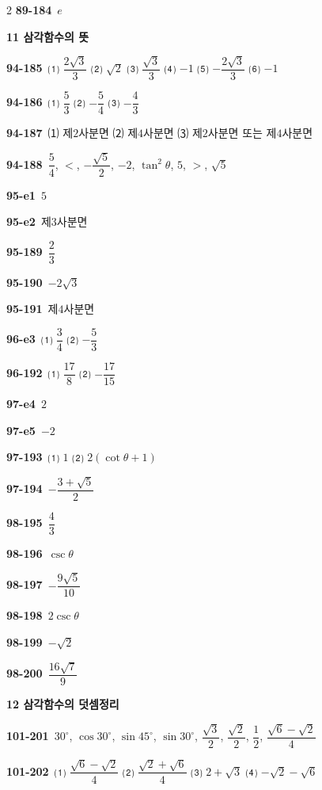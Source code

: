 \documentclass[10pt,a4paper]{article}
\begin{document}
\begin{multicols}{2}
\noindent\textbf{89-184}\ $e$\par
\noindent\textbf{11 삼각함수의 뜻}\par\smallskip
\noindent\textbf{94-185}\ ⑴ $\dfrac{2\sqrt{3}}{3}$ ⑵ $\sqrt{2}$ ⑶ $\dfrac{\sqrt{3}}{3}$ ⑷ $-1$ ⑸ $-\dfrac{2\sqrt{3}}{3}$ ⑹ $-1$\par
\noindent\textbf{94-186}\ ⑴ $\dfrac{5}{3}$ ⑵ $-\dfrac{5}{4}$ ⑶ $-\dfrac{4}{3}$\par
\noindent\textbf{94-187}\ ⑴ 제$2$사분면 ⑵ 제$4$사분면 ⑶ 제$2$사분면 또는 제$4$사분면\par
\noindent\textbf{94-188}\ $\dfrac{5}{4}$, $<$, $-\dfrac{\sqrt{5}}{2}$, $-2$, $\tan^2\theta$, $5$, $>$, $\sqrt{5}$\par
\noindent\textbf{95-e1}\ $5$\par
\noindent\textbf{95-e2}\ 제$3$사분면\par
\noindent\textbf{95-189}\ $\dfrac{2}{3}$\par
\noindent\textbf{95-190}\ $-2\sqrt{3}$\par
\noindent\textbf{95-191}\ 제$4$사분면\par
\noindent\textbf{96-e3}\ ⑴ $\dfrac{3}{4}$ ⑵ $-\dfrac{5}{3}$\par
\noindent\textbf{96-192}\ ⑴ $\dfrac{17}{8}$ ⑵ $-\dfrac{17}{15}$\par
\noindent\textbf{97-e4}\ $2$\par
\noindent\textbf{97-e5}\ $-2$\par
\noindent\textbf{97-193}\ ⑴ $1$ ⑵ $2(\cot\theta+1)$\par
\noindent\textbf{97-194}\ $-\dfrac{3+\sqrt{5}}{2}$\par
\noindent\textbf{98-195}\ $\dfrac{4}{3}$\par
\noindent\textbf{98-196}\ $\csc\theta$\par
\noindent\textbf{98-197}\ $-\dfrac{9\sqrt{5}}{10}$\par
\noindent\textbf{98-198}\ $2\csc\theta$\par
\noindent\textbf{98-199}\ $-\sqrt{2}$\par
\noindent\textbf{98-200}\ $\dfrac{16\sqrt{7}}{9}$\par
\noindent\textbf{12 삼각함수의 덧셈정리}\par\smallskip
\noindent\textbf{101-201}\ $30^\circ$, $\cos 30^\circ$, $\sin 45^\circ$, $\sin 30^\circ$, $\dfrac{\sqrt{3}}{2}$, $\dfrac{\sqrt{2}}{2}$, $\dfrac{1}{2}$, $\dfrac{\sqrt{6}-\sqrt{2}}{4}$\par
\noindent\textbf{101-202}\ ⑴ $\dfrac{\sqrt{6}-\sqrt{2}}{4}$ ⑵ $\dfrac{\sqrt{2}+\sqrt{6}}{4}$ ⑶ $2+\sqrt{3}$ ⑷ $-\sqrt{2}-\sqrt{6}$\par

\end{multicols}
\end{document}
